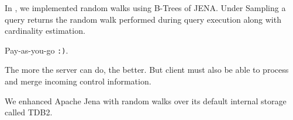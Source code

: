 In \NAME, we implemented random walks using B-Trees of JENA. Under
Sampling a query returns the random walk performed during query
execution along with cardinality estimation. 



Pay-as-you-go \texttt{:)}.

The more the server can do, the better. But client must also be able
to process and merge incoming control information.

We enhanced Apache Jena with random walks over its default internal
storage called TDB2.



